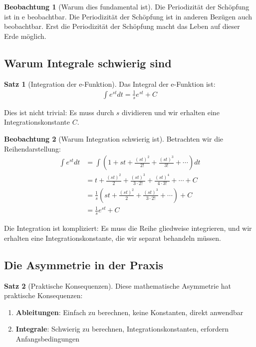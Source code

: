 ﻿\documentclass[a4paper,12pt]{report}
\theoremstyle{definition}
\newtheorem{satz}{Satz}
\newtheorem{beobachtung}{Beobachtung}
\begin{document}
\begin{beobachtung}[Warum dies fundamental ist]
		Die Periodizität der Schöpfung ist in e beobachtbar. Die Periodizität der Schöpfung ist in anderen Bezügen auch beobachtbar. Erst die Periodizität der Schöpfung macht das Leben auf dieser Erde möglich.
	\end{beobachtung}
	
	\subsection{Warum Integrale schwierig sind}
	
	\begin{satz}[Integration der e-Funktion]
		Das Integral der e-Funktion ist:
		\begin{align}
			\int e^{st} dt = \frac{1}{s} e^{st} + C
		\end{align}
		
		Dies ist nicht trivial: Es muss durch $s$ dividieren und wir erhalten eine Integrationskonstante $C$.
	\end{satz}
	
	\begin{beobachtung}[Warum Integration schwierig ist]
		Betrachten wir die Reihendarstellung:
		\begin{align}
			\int e^{st} dt &= \int \left(1 + st + \frac{(st)^2}{2!} + \frac{(st)^3}{3!} + \cdots\right) dt \\
			&= t + \frac{(st)^2}{2} + \frac{(st)^3}{3 \cdot 2!} + \frac{(st)^4}{4 \cdot 3!} + \cdots + C \\
			&= \frac{1}{s} \left(st + \frac{(st)^2}{2} + \frac{(st)^3}{3 \cdot 2!} + \cdots\right) + C \\
			&= \frac{1}{s} e^{st} + C
		\end{align}
		
		Die Integration ist kompliziert: Es muss die Reihe gliedweise integrieren, und wir erhalten eine Integrationskonstante, die wir separat behandeln müssen.
	\end{beobachtung}
	
	\subsection{Die Asymmetrie in der Praxis}
	
	\begin{satz}[Praktische Konsequenzen]
		Diese mathematische Asymmetrie hat praktische Konsequenzen:
		
		\begin{enumerate}
			\item[-] \textbf{Ableitungen}: Einfach zu berechnen, keine Konstanten, direkt anwendbar
			\item[-] \textbf{Integrale}: Schwierig zu berechnen, Integrationskonstanten, erfordern Anfangsbedingungen
		\end{enumerate}
	\end{satz}
	
\end{document}
